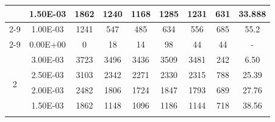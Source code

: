 \begin{table}[H]
{\begin{tabular}{|c|c|c|c|c|c|c|c|c|}
                               & 1.50E-03         & 1862      & 1240                                                       & 1168                                                      & 1285                                                      & 1231    & 631    & 33.888                                                             \\ \cline{2-9}
                               & 1.00E-03         & 1241      & 547                                                        & 485                                                       & 634                                                       & 556     & 685    & 55.2                                                               \\ \cline{2-9}
                               & 0.00E+00         & 0         & 18                                                         & 14                                                        & 98                                                        & 44      & 44     & -                                                                  \\ \hline
            \multirow{6}{*}{2} & 3.00E-03         & 3723      & 3496                                                       & 3436                                                      & 3509                                                      & 3481    & 242    & 6.50                                                               \\ \cline{2-9}
                               & 2.50E-03         & 3103      & 2342                                                       & 2271                                                      & 2330                                                      & 2315    & 788    & 25.39                                                              \\ \cline{2-9}
                               & 2.00E-03         & 2482      & 1806                                                       & 1724                                                      & 1847                                                      & 1793    & 689    & 27.76                                                              \\ \cline{2-9}
                               & 1.50E-03         & 1862      & 1148                                                       & 1096                                                      & 1186                                                      & 1144    & 718    & 38.56                                                              \\ \cline{2-9}

\end{tabular}}
\end{table}
